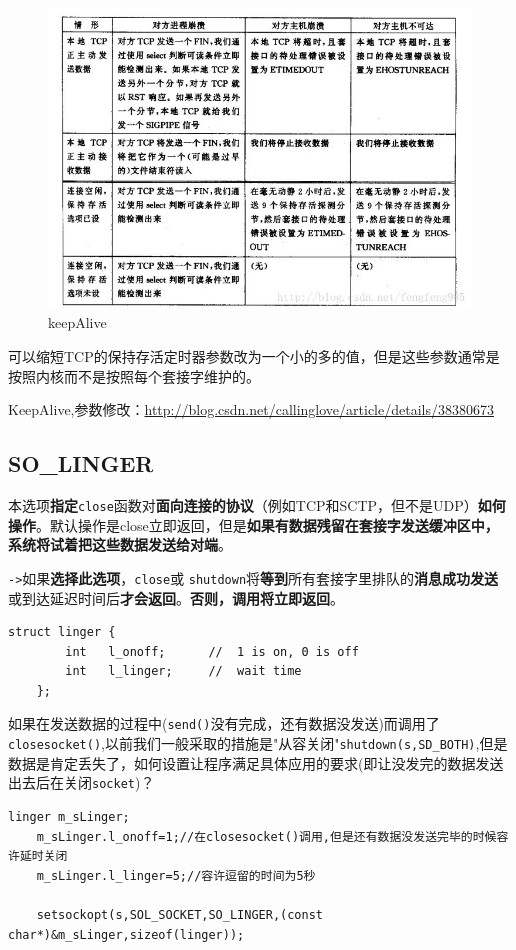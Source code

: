 \documentclass[UTF8,a4paper,8pt]{ctexbook}
\begin{document}
			\begin{figure}[h]
				\centering
				\includegraphics[scale = 0.9]{keepAlive.jpg}
				\caption{keepAlive}
			\end{figure}
			
			可以缩短TCP的保持存活定时器参数改为一个小的多的值，但是这些参数通常是按照内核而不是按照每个套接字维护的。
			
			KeepAlive,参数修改：\url{http://blog.csdn.net/callinglove/article/details/38380673}
			
			
		\subsection{SO\_LINGER}本选项\textbf{指定}\verb|close|函数对\textbf{面向连接的协议}（例如TCP和SCTP，但不是UDP）\textbf{如何操作}。默认操作是close立即返回，但是\textbf{如果有数据残留在套接字发送缓冲区中，系统将试着把这些数据发送给对端}。
			
			\verb|->|如果\textbf{选择此选项}，\verb|close|或 \verb|shutdown|将\textbf{等到}所有套接字里排队的\textbf{消息成功发送}或到达延迟时间后\textbf{才会返回}。\textbf{否则，调用将立即返回}。
			
			\begin{lstlisting}[frame=L]
	struct linger {  
		int   l_onoff;      //  1 is on, 0 is off
		int   l_linger;     //  wait time
	};  
			\end{lstlisting}
			
			如果在发送数据的过程中(\verb|send()|没有完成，还有数据没发送)而调用了\verb|closesocket()|,以前我们一般采取的措施是"从容关闭"\verb|shutdown(s,SD_BOTH)|,但是数据是肯定丢失了，如何设置让程序满足具体应用的要求(即让没发完的数据发送出去后在关闭\verb|socket|)？
			\begin{lstlisting}[frame=L]	
	linger m_sLinger;
	m_sLinger.l_onoff=1;//在closesocket()调用,但是还有数据没发送完毕的时候容许延时关闭
	m_sLinger.l_linger=5;//容许逗留的时间为5秒
	
	setsockopt(s,SOL_SOCKET,SO_LINGER,(const char*)&m_sLinger,sizeof(linger));
			\end{lstlisting}
			
\end{document}
